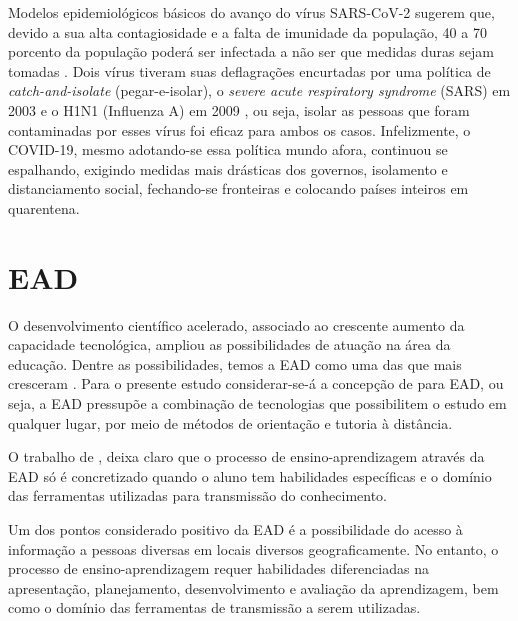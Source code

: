 \documentclass[
	arial,
	12pt,				%
	openright,			%
	twoside,			%
	a4paper,			%
	chapter=TITLE,		%
	english,			%
	french,				%
	spanish,			%
	brazil,				%
	]{abntex2}
\begin{document}
Modelos epidemiológicos básicos do avanço do vírus SARS-CoV-2 sugerem que, devido a sua alta contagiosidade e a falta de imunidade da população, 40 a 70 porcento da população poderá ser infectada a não ser que medidas duras sejam tomadas \cite{salathe2020covid}. Dois vírus tiveram suas deflagrações encurtadas por uma política de \textit{catch-and-isolate} (pegar-e-isolar), o \textit{severe acute respiratory syndrome} (SARS) em 2003 e o H1N1 (Influenza A) em 2009 \cite{watkins2020preventing}, ou seja, isolar as pessoas que foram contaminadas por esses vírus foi eficaz para ambos os casos. Infelizmente, o COVID-19, mesmo adotando-se essa política mundo afora, continuou se espalhando, exigindo medidas mais drásticas dos governos, isolamento e distanciamento social, fechando-se fronteiras e colocando países inteiros em quarentena. 

\section{EAD}

O desenvolvimento científico acelerado, associado ao crescente aumento da capacidade tecnológica, ampliou as possibilidades de atuação na área da educação. Dentre as possibilidades, temos a EAD como uma das que mais cresceram \cite{jorgeEad}. Para o presente estudo considerar-se-á a concepção de  para EAD, ou seja, a EAD pressupõe a combinação de tecnologias que possibilitem o estudo em qualquer lugar, por meio de métodos de orientação e tutoria à distância.

O trabalho de , deixa claro que o processo de ensino-aprendizagem através da EAD só é concretizado quando o aluno tem habilidades específicas e o domínio das ferramentas utilizadas para transmissão do conhecimento. 

\begin{citacao}
Um dos pontos considerado positivo da EAD é a possibilidade do acesso à informação a pessoas diversas em locais diversos geograficamente. No entanto, o processo de ensino-aprendizagem requer habilidades diferenciadas na apresentação, planejamento, desenvolvimento e avaliação da aprendizagem, bem como o domínio das ferramentas de transmissão a serem utilizadas. \cite{jorgeEad}
\end{citacao}  
\end{document}
